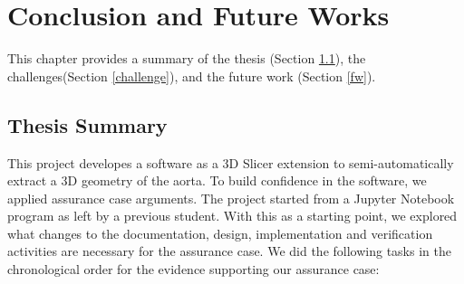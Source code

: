 \chapter{Conclusion and Future Works}

This chapter provides a summary of the thesis (Section \ref{thesis_sum}), the challenges(Section \ref{challenge}), and the future work (Section \ref{fw}).

\section{Thesis Summary}\label{thesis_sum}

This project developes a software as a 3D Slicer extension to semi-automatically extract a 3D geometry of the aorta. To build confidence in the software, we applied assurance case arguments. The project started from a Jupyter Notebook program as left by a previous student. With this as a starting point, we explored what changes to the documentation, design, implementation and verification activities are necessary for the assurance case. We did the following tasks in the chronological order for the evidence supporting our assurance case:

